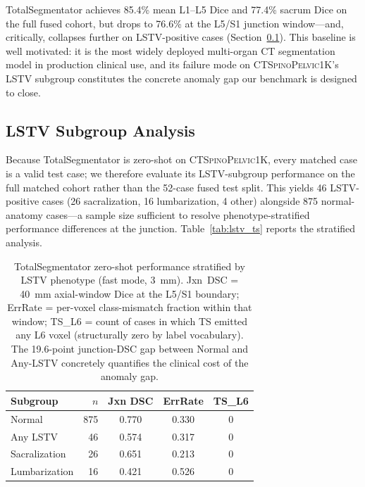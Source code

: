 \documentclass[pmlr]{jmlr}
\newcommand{\dataset}{\textsc{CTSpinoPelvic1K}}
\begin{document}
TotalSegmentator achieves 85.4\% mean L1--L5 Dice and 77.4\%
sacrum Dice on the full fused cohort, but drops to 76.6\% at the
L5/S1 junction window---and, critically, collapses further on
LSTV-positive cases (Section~\ref{sec:lstv_subgroup}).
This baseline is well motivated: it is the most widely deployed
multi-organ CT segmentation model in production clinical use, and
its failure mode on \dataset{}'s LSTV subgroup constitutes the
concrete anomaly gap our benchmark is designed to close.

\subsection{LSTV Subgroup Analysis}
\label{sec:lstv_subgroup}

Because TotalSegmentator is zero-shot on \dataset{}, every matched
case is a valid test case; we therefore evaluate its LSTV-subgroup
performance on the full matched cohort rather than the 52-case
fused test split.
This yields 46 LSTV-positive cases (26 sacralization,
16 lumbarization, 4 other) alongside 875 normal-anatomy cases---a
sample size sufficient to resolve phenotype-stratified performance
differences at the junction.
Table~\ref{tab:lstv_ts} reports the stratified analysis.

\begin{table}[t]
  {\caption{TotalSegmentator zero-shot performance stratified by
    LSTV phenotype (fast mode, 3~mm).
    Jxn~DSC = 40~mm axial-window Dice at the L5/S1 boundary;
    ErrRate = per-voxel class-mismatch fraction within that window;
    TS\_L6 = count of cases in which TS emitted any L6 voxel
    (structurally zero by label vocabulary).
    The 19.6-point junction-DSC gap between Normal and Any-LSTV
    concretely quantifies the clinical cost of the anomaly gap.}}
  {\small\begin{tabular}{lrccc}
  \toprule
  \bfseries Subgroup & \bfseries $n$
    & \bfseries Jxn DSC & \bfseries ErrRate & \bfseries TS\_L6 \\
  \midrule
  Normal              & 875 & 0.770 & 0.330 & 0 \\
  Any LSTV            &  46 & 0.574 & 0.317 & 0 \\
  \quad Sacralization &  26 & 0.651 & 0.213 & 0 \\
  \quad Lumbarization &  16 & 0.421 & 0.526 & 0 \\
  \bottomrule
  \end{tabular}}
\end{table}
\end{document}
